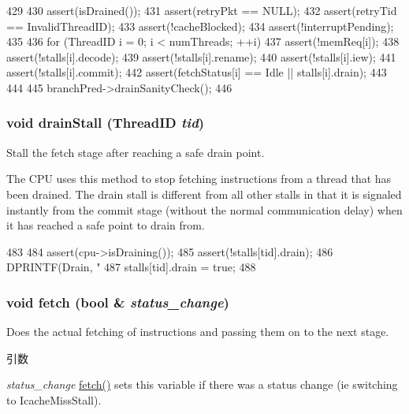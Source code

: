 \begin{DoxyCode}
429 {
430     assert(isDrained());
431     assert(retryPkt == NULL);
432     assert(retryTid == InvalidThreadID);
433     assert(!cacheBlocked);
434     assert(!interruptPending);
435 
436     for (ThreadID i = 0; i < numThreads; ++i) {
437         assert(!memReq[i]);
438         assert(!stalls[i].decode);
439         assert(!stalls[i].rename);
440         assert(!stalls[i].iew);
441         assert(!stalls[i].commit);
442         assert(fetchStatus[i] == Idle || stalls[i].drain);
443     }
444 
445     branchPred->drainSanityCheck();
446 }
\end{DoxyCode}
\hypertarget{classDefaultFetch_ad1c01dde67aa909bd829896f6f587502}{
\subsubsection[{drainStall}]{\setlength{\rightskip}{0pt plus 5cm}void drainStall ({\bf ThreadID} {\em tid})}}
\label{classDefaultFetch_ad1c01dde67aa909bd829896f6f587502}
Stall the fetch stage after reaching a safe drain point.

The CPU uses this method to stop fetching instructions from a thread that has been drained. The drain stall is different from all other stalls in that it is signaled instantly from the commit stage (without the normal communication delay) when it has reached a safe point to drain from. 


\begin{DoxyCode}
483 {
484     assert(cpu->isDraining());
485     assert(!stalls[tid].drain);
486     DPRINTF(Drain, "%
487     stalls[tid].drain = true;
488 }
\end{DoxyCode}
\hypertarget{classDefaultFetch_a77759cf15b084e00a9e4e8ca810a0be7}{
\subsubsection[{fetch}]{\setlength{\rightskip}{0pt plus 5cm}void fetch (bool \& {\em status\_\-change})}}
\label{classDefaultFetch_a77759cf15b084e00a9e4e8ca810a0be7}
Does the actual fetching of instructions and passing them on to the next stage. 
\begin{DoxyParams}{引数}
\item[{\em status\_\-change}]\hyperlink{classDefaultFetch_a77759cf15b084e00a9e4e8ca810a0be7}{fetch()} sets this variable if there was a status change (ie switching to IcacheMissStall). \end{DoxyParams}



